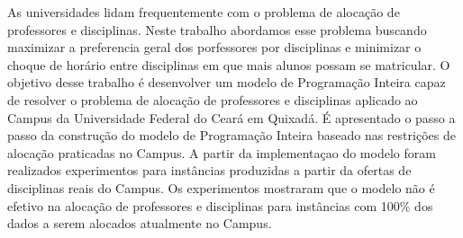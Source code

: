 As universidades lidam frequentemente com o problema de alocação de professores e disciplinas. Neste trabalho abordamos esse problema buscando maximizar a preferencia geral dos porfessores por disciplinas e minimizar o choque de horário entre disciplinas em que mais alunos possam se matricular. O objetivo desse trabalho é desenvolver um modelo de Programação Inteira capaz de resolver o problema de alocação de professores e disciplinas aplicado ao Campus da Universidade Federal do Ceará em Quixadá. É apresentado o passo a passo da construção do modelo de Programação Inteira baseado nas restrições de alocação praticadas no Campus. A partir da implementaçao do modelo foram realizados experimentos para instâncias produzidas a partir da ofertas de disciplinas reais do Campus. Os experimentos mostraram que o modelo não é efetivo na alocação de professores e disciplinas para instâncias com 100\% dos dados a serem alocados atualmente no Campus.



